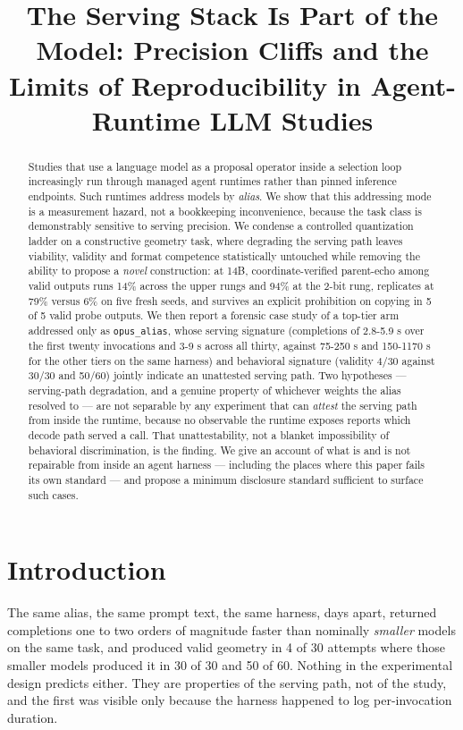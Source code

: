 \documentclass[11pt]{article}
\title{The Serving Stack Is Part of the Model: Precision Cliffs and the Limits
of Reproducibility in Agent-Runtime LLM Studies}
\author{}
\date{}
\begin{document}
\maketitle

\begin{abstract}
Studies that use a language model as a proposal operator inside a selection loop
increasingly run through managed agent runtimes rather than pinned inference endpoints.
Such runtimes address models by \emph{alias}. We show that this addressing mode is a
measurement hazard, not a bookkeeping inconvenience, because the task class is
demonstrably sensitive to serving precision. We condense a controlled quantization
ladder on a constructive geometry task, where degrading the serving path leaves
viability, validity and format competence statistically untouched while removing the
ability to propose a \emph{novel} construction: at 14B, coordinate-verified parent-echo
among valid outputs runs 14\% across the upper rungs and 94\% at the 2-bit rung, replicates
at 79\% versus 6\% on five fresh seeds, and survives an explicit prohibition on copying in
5 of 5 valid probe outputs. We then report a forensic case study of a top-tier arm
addressed only as \texttt{opus\_alias}, whose serving signature (completions of 2.8-5.9 s over
the first twenty invocations and 3-9 s across all thirty, against 75-250 s and 150-1170 s
for the other tiers on the same harness) and behavioral signature (validity 4/30 against
30/30 and 50/60) jointly indicate an unattested serving path. Two hypotheses ---
serving-path degradation, and a genuine property of whichever weights the alias resolved
to --- are not separable by any experiment that can \emph{attest} the serving path from inside
the runtime, because no observable the runtime exposes reports which decode path served a
call. That unattestability, not a blanket impossibility of behavioral discrimination, is
the finding. We give an account of what is and is not repairable from inside an agent
harness --- including the places where this paper fails its own standard --- and propose a
minimum disclosure standard sufficient to surface such cases.
\end{abstract}

\section{Introduction}

The same alias, the same prompt text, the same harness, days apart, returned completions
one to two orders of magnitude faster than nominally \emph{smaller} models on the same task,
and produced valid geometry in 4 of 30 attempts where those smaller models produced it in
30 of 30 and 50 of 60. Nothing in the experimental design predicts either. They are
properties of the serving path, not of the study, and the first was visible only because
the harness happened to log per-invocation duration.
\end{document}
